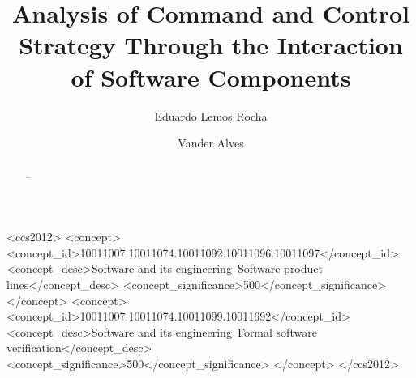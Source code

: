 \documentclass[acmsmall,colorlinks, dvipsnames]{acmart}
\begin{document}
 




\title{Analysis of Command and Control Strategy Through the Interaction of Software Components}

    

\author{Eduardo Lemos Rocha}

\author{Vander Alves}


\begin{abstract}

--

\end{abstract}

\begin{CCSXML}
<ccs2012>
   <concept>
       <concept_id>10011007.10011074.10011092.10011096.10011097</concept_id>
       <concept_desc>Software and its engineering~Software product lines</concept_desc>
       <concept_significance>500</concept_significance>
       </concept>
   <concept>
       <concept_id>10011007.10011074.10011099.10011692</concept_id>
       <concept_desc>Software and its engineering~Formal software verification</concept_desc>
       <concept_significance>500</concept_significance>
       </concept>
 </ccs2012>
\end{CCSXML}



\maketitle
    
\end{document}
